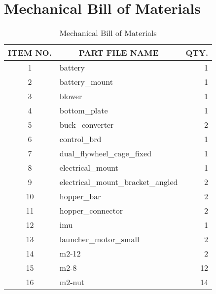 \chapter{Mechanical Bill of Materials}
\label{appendix:mech_bom}

\begin{longtable}{clr}
	\caption{Mechanical Bill of Materials}
	\label{tab:mech_bom}
	\endfirsthead
	\endhead
	\hline
	ITEM NO. & \multicolumn{1}{c}{PART FILE NAME}      & \multicolumn{1}{c}{QTY.} \\ \hline
	1        & battery                                 & 1                        \\ \hline
	2        & battery\_mount                          & 1                        \\ \hline
	3        & blower                                  & 1                        \\ \hline
	4        & bottom\_plate                           & 1                        \\ \hline
	5        & buck\_converter                         & 2                        \\ \hline
	6        & control\_brd                            & 1                        \\ \hline
	7        & dual\_flywheel\_cage\_fixed             & 1                        \\ \hline
	8        & electrical\_mount                       & 1                        \\ \hline
	9        & electrical\_mount\_bracket\_angled      & 2                        \\ \hline
	10       & hopper\_bar                             & 2                        \\ \hline
	11       & hopper\_connector                       & 2                        \\ \hline
	12       & imu                                     & 1                        \\ \hline
	13       & launcher\_motor\_small                  & 2                        \\ \hline
	14       & m2-12                                   & 2                        \\ \hline
	15       & m2-8                                    & 12                       \\ \hline
	16       & m2-nut                                  & 14                       \\ \hline

\end{longtable}

